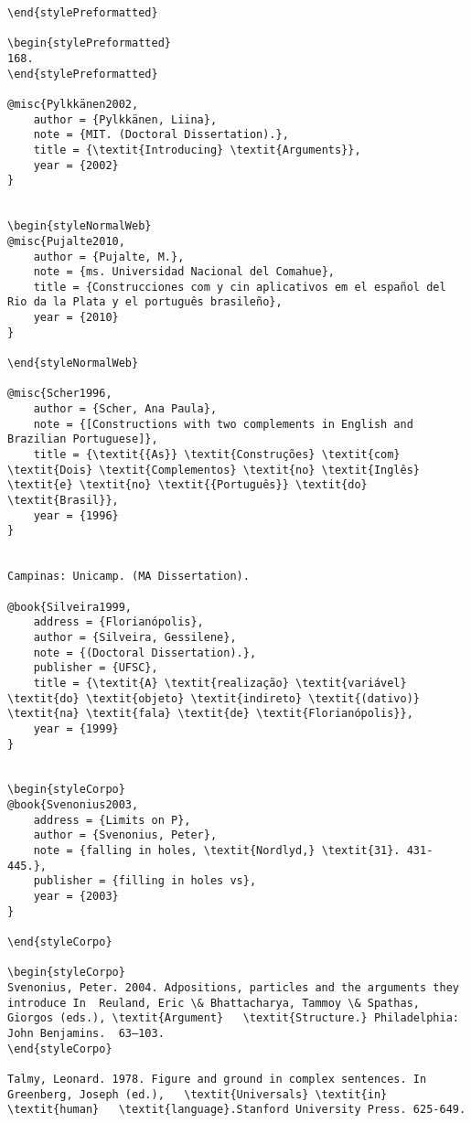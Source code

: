 \documentclass[output=paper,modfonts,nonflat]{langsci/langscibook}
\begin{document}
\begin{verbatim}
\end{stylePreformatted}

\begin{stylePreformatted}
168.
\end{stylePreformatted}

@misc{Pylkkänen2002,
	author = {Pylkkänen, Liina},
	note = {MIT. (Doctoral Dissertation).},
	title = {\textit{Introducing} \textit{Arguments}},
	year = {2002}
}


\begin{styleNormalWeb}
@misc{Pujalte2010,
	author = {Pujalte, M.},
	note = {ms. Universidad Nacional del Comahue},
	title = {Construcciones com y cin aplicativos em el español del Rio da la Plata y el português brasileño},
	year = {2010}
}

\end{styleNormalWeb}

@misc{Scher1996,
	author = {Scher, Ana Paula},
	note = {[Constructions with two complements in English and Brazilian Portuguese]},
	title = {\textit{{As}} \textit{Construções} \textit{com} \textit{Dois} \textit{Complementos} \textit{no} \textit{Inglês} \textit{e} \textit{no} \textit{{Português}} \textit{do} \textit{Brasil}},
	year = {1996}
}


Campinas: Unicamp. (MA Dissertation).

@book{Silveira1999,
	address = {Florianópolis},
	author = {Silveira, Gessilene},
	note = {(Doctoral Dissertation).},
	publisher = {UFSC},
	title = {\textit{A} \textit{realização} \textit{variável} \textit{do} \textit{objeto} \textit{indireto} \textit{(dativo)} \textit{na} \textit{fala} \textit{de} \textit{Florianópolis}},
	year = {1999}
}


\begin{styleCorpo}
@book{Svenonius2003,
	address = {Limits on P},
	author = {Svenonius, Peter},
	note = {falling in holes, \textit{Nordlyd,} \textit{31}. 431-445.},
	publisher = {filling in holes vs},
	year = {2003}
}

\end{styleCorpo}

\begin{styleCorpo}
Svenonius, Peter. 2004. Adpositions, particles and the arguments they introduce In  Reuland, Eric \& Bhattacharya, Tammoy \& Spathas, Giorgos (eds.), \textit{Argument}   \textit{Structure.} Philadelphia: John Benjamins.  63–103.
\end{styleCorpo}

Talmy, Leonard. 1978. Figure and ground in complex sentences. In Greenberg, Joseph (ed.),   \textit{Universals} \textit{in} \textit{human}   \textit{language}.Stanford University Press. 625-649.


\end{verbatim}
\end{document}
